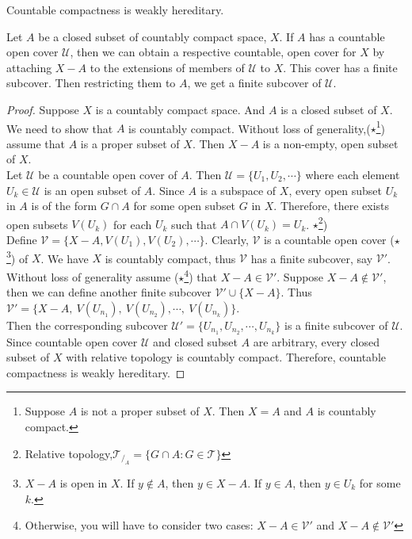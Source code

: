 \begin{theorem}
	Countable compactness is weakly hereditary.
	\cite[11.1.3]{joshi}
\end{theorem}
\begin{synopsis}
	Let $A$ be a closed subset of countably compact space, $X$.
	If $A$ has a countable open cover $\mathcal{U}$, then we can obtain a respective countable, open cover for $X$ by attaching $X-A$ to the extensions of members of $\mathcal{U}$ to $X$.
	This cover has a finite subcover.
	Then restricting them to $A$, we get a finite subcover of $\mathcal{U}$.
\end{synopsis}
\begin{proof}
	Suppose $X$ is a countably compact space.
	And $A$ is a closed subset of $X$.
	We need to show that $A$ is countably compact.
	Without loss of generality,($\star$\footnote{Suppose $A$ is not a proper subset of $X$.
	Then $X = A$ and $A$ is countably compact.}) assume that $A$ is a proper subset of $X$.
	Then $X-A$ is a non-empty, open subset of $X$.\\ 

	Let $\mathcal{U}$ be a countable open cover of $A$.
	Then $\mathcal{U} = \{ U_1, U_2, \cdots \}$ where each element $U_k \in \mathcal{U}$ is an open subset of $A$.
	Since $A$ is a subspace of $X$, every open subset $U_k$ in $A$ is of the form $G \cap A$ for some open subset $G$ in $X$.
	Therefore, there exists open subsets $V(U_k)$ for each $U_k$ such that $A \cap V(U_k) = U_k$.
	$\star$\footnote{Relative topology,$\mathcal{T}_{/_A} = \{ G \cap A : G \in \mathcal{T} \}$})\\

	Define $\mathcal{V} = \{ X-A, V(U_1), V(U_2), \cdots \}$.
	Clearly, $\mathcal{V}$ is a countable open cover ($\star$\footnote{$X-A$ is open in $X$.
	If $y \not\in A$, then $y \in X-A$.
	If $y \in A$, then $y \in U_k$ for some $k$.}) of $X$.
	We have $X$ is countably compact, thus $\mathcal{V}$ has a finite subcover, say $\mathcal{V}'$.
	Without loss of generality assume ($\star$\footnote{Otherwise, you will have to consider two cases: $X-A \in \mathcal{V}'$ and $X-A \not\in \mathcal{V}'$}) that $X-A \in \mathcal{V}'$.
	Suppose $X-A \not\in \mathcal{V}'$, then we can define another finite subcover $\mathcal{V}' \cup \{X-A\}$.
	Thus $\mathcal{V}' = \{ X-A,\ V(U_{n_1}),\ V(U_{n_2}),\cdots,\ V(U_{n_k})\}$.\\

	Then the corresponding subcover $\mathcal{U}'=\{U_{n_1},U_{n_2},\cdots,U_{n_k}\}$ is a finite subcover of $\mathcal{U}$.
	Since countable open cover $\mathcal{U}$ and closed subset $A$ are arbitrary, every closed subset of $X$ with relative topology is countably compact.
	Therefore, countable compactness is weakly hereditary.
\end{proof}

